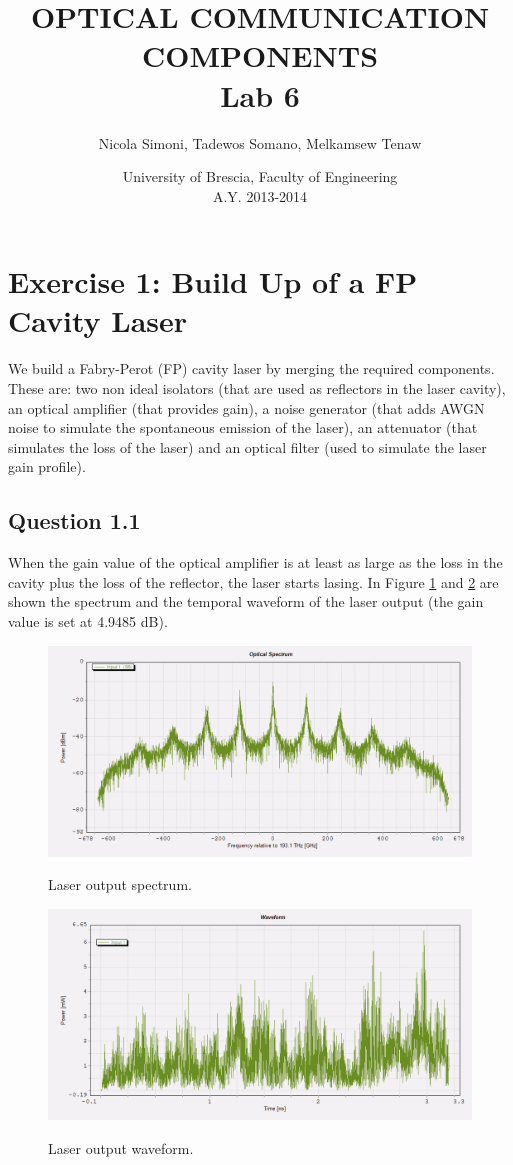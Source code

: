 \documentclass[a4paper,10pt]{report}
\title{\textbf{OPTICAL COMMUNICATION COMPONENTS \\ Lab 6}}
\author{Nicola Simoni, Tadewos Somano, Melkamsew Tenaw}
\date{University of Brescia, Faculty of Engineering\\A.Y. 2013-2014}
\begin{document}
\maketitle


\section*{Exercise 1: Build Up of a FP Cavity Laser}
We build a Fabry-Perot (FP) cavity laser by merging the required components.
These are: two non ideal isolators (that are used as reflectors in the laser cavity), an optical
amplifier (that provides gain), a noise generator (that adds AWGN noise to simulate the spontaneous emission of the laser),
an attenuator (that simulates the loss of the laser) and an optical filter (used to simulate the laser gain profile).

\subsection*{Question 1.1}
When the gain value of the optical amplifier is at least as large as the loss in the cavity plus the loss of the reflector, the laser starts lasing.
In Figure \ref{Tx1_11} and \ref{Tx1_12} are shown the spectrum and the temporal waveform of the laser output (the gain value is set at 4.9485 dB).

\begin{figure}[!ht]
  \centering
  \includegraphics[width=12cm]{Tx1_11.png}\\
  \caption{Laser output spectrum.}
  \label{Tx1_11}
\end{figure}

\begin{figure}[!ht]
  \centering
  \includegraphics[width=12cm]{Tx1_12.png}\\
  \caption{Laser output waveform.}
  \label{Tx1_12}
\end{figure}
\end{document}

